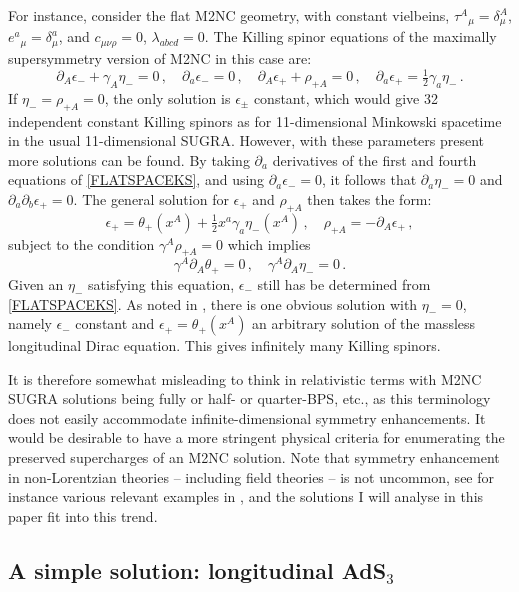 \documentclass[11pt]{article}
\newcommand{\be}{\begin{equation}}
\newcommand{\ee}{\end{equation}}
\numberwithin{equation}{section}
\begin{document}
{{For instance, consider the flat M2NC geometry, with constant vielbeins, $\tau^A{}_\mu = \delta^A_\mu$, $e^a{}_\mu = \delta^a_\mu$, and $c_{\mu\nu\rho} = 0$, $\lambda_{abcd} = 0$.
The Killing spinor equations of the maximally supersymmetry version of M2NC in this case are:
\be
\partial_A \epsilon_- + \gamma_A \eta_{-} = 0 \,,\quad \partial_a \epsilon_- = 0 \,,\quad
\partial_A \epsilon_+ + \rho_{+A} = 0 \,,\quad
\partial_a \epsilon_+ = \tfrac12 \gamma_a \eta_- \,.
\label{FLATSPACEKS}
\ee
If $\eta_- = \rho_{+A} = 0$, the only solution is $\epsilon_\pm$ constant, which would give 32 independent constant Killing spinors as for 11-dimensional Minkowski spacetime in the usual 11-dimensional SUGRA.
However, with these parameters present more solutions can be found.
By taking $\partial_a$ derivatives of the first and fourth equations of \eqref{FLATSPACEKS}, and using $\partial_a \epsilon_- = 0$, it follows that $\partial_a \eta_- = 0$ and $\partial_a \partial_b \epsilon_+ = 0$.
The general solution for $\epsilon_+$ and $\rho_{+A}$ then takes the form:
\be
\epsilon_+ = \theta_+ (x^A) + \tfrac12 x^a \gamma_a \eta_-(x^A) \,,\quad
\rho_{+A} = - \partial_A \epsilon_+ \,,
\ee
subject to the condition $\gamma^A \rho_{+A} = 0$ which implies 
\be
\gamma^A \partial_A \theta_+ = 0 \,,\quad
\gamma^A \partial_A \eta_- = 0 \,.
\ee
Given an $\eta_-$ satisfying this equation, $\epsilon_-$ still has be determined from \eqref{FLATSPACEKS}.
As noted in \cite{Bergshoeff:2024nin}, there is one obvious solution with $\eta_- = 0$, namely 
$\epsilon_-$ constant and $\epsilon_+ = \theta_+(x^A)$ an arbitrary solution of the massless longitudinal Dirac equation. This gives infinitely many Killing spinors.

It is therefore somewhat misleading to think in relativistic terms with M2NC SUGRA solutions being fully or half- or quarter-BPS, etc., as this terminology does not easily accommodate infinite-dimensional symmetry enhancements.
It would be desirable to have a more stringent physical criteria for enumerating the preserved supercharges of an M2NC solution.
Note that symmetry enhancement in non-Lorentzian theories -- including field theories -- is not uncommon, see for instance various relevant examples in \cite{Batlle:2016iel, Blair:2020gng, Lambert:2024uue, Lambert:2024yjk, Lambert:2024ncn}, and the solutions I will analyse in this paper fit into this trend.

 

\subsection{A simple solution: longitudinal AdS${}_3$} 
\label{sec:solutions}

}}
\end{document}
